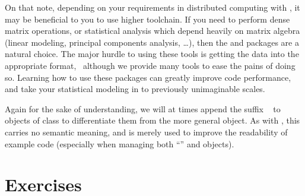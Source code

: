 On that note, depending on your requirements in distributed computing
with , it may be beneficial to you to use higher
 toolchain.  If you need to perform dense matrix operations,
or statistical analysis which depend heavily on matrix algebra (linear
modeling, principal components analysis, \dots), then the 
and  packages are a natural choice. The major hurdle to using
these tools is getting the data into the appropriate
 format,~ although we provide
many tools to ease the pains of doing so. Learning how to use these packages
can greatly improve code performance, and take your statistical modeling
in  to previously unimaginable scales.

Again for the sake of understanding, we will at times append the suffix
~ to objects of class
 to differentiate them from the
more general  object.  As with , this carries no
semantic meaning, and is merely used to improve the readability of example
code (especially when managing both ``'' and 
objects).




\section{Exercises}
\label{sec:background}

